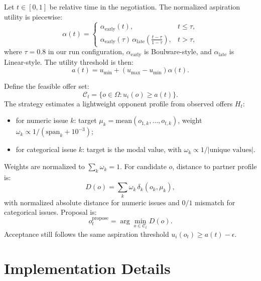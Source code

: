 \documentclass[11pt]{article}
\begin{document}
Let \(t \in [0,1]\) be relative time in the negotiation. The normalized aspiration utility is piecewise:
\[
\alpha(t)=
\begin{cases}
\alpha_{\text{early}}(t), & t \le \tau, \\
\alpha_{\text{early}}(\tau)\,\alpha_{\text{late}}\!\left(\frac{t-\tau}{1-\tau}\right), & t>\tau,
\end{cases}
\]
where \(\tau=0.8\) in our run configuration, \(\alpha_{\text{early}}\) is Boulware-style, and \(\alpha_{\text{late}}\) is Linear-style. The utility threshold is then:
\[
a(t)=u_{\min} + (u_{\max}-u_{\min})\alpha(t).
\]

Define the feasible offer set:
\[
\mathcal{C}_t = \{o \in \Omega : u_i(o) \ge a(t)\}.
\]
The strategy estimates a lightweight opponent profile from observed offers \(H_t\):
\begin{itemize}[leftmargin=1.5em]
    \item for numeric issue \(k\): target \(\mu_k=\text{mean}(o_{1,k},\dots,o_{t,k})\), weight \(\omega_k \propto 1/(\text{span}_k+10^{-3})\);
    \item for categorical issue \(k\): target is the modal value, with \(\omega_k \propto 1/|\text{unique values}|\).
\end{itemize}
Weights are normalized to \(\sum_k \omega_k=1\). For candidate \(o\), distance to partner profile is:
\[
D(o)=\sum_k \omega_k\,\delta_k(o_k,\mu_k),
\]
with normalized absolute distance for numeric issues and \(0/1\) mismatch for categorical issues. Proposal is:
\[
o_t^{\text{propose}}=\arg\min_{o \in \mathcal{C}_t} D(o).
\]
Acceptance still follows the same aspiration threshold \(u_i(o_t)\ge a(t)-\epsilon\).

\section{Implementation Details}
\end{document}
